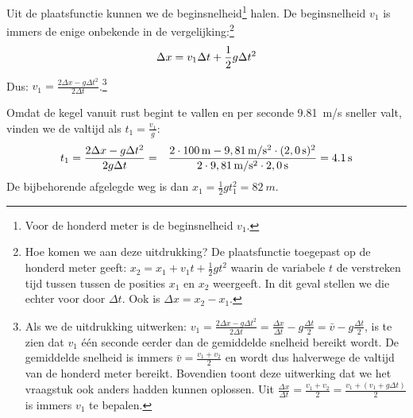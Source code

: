 \documentclass{ximera}
\begin{document}
\begin{exercise}
\begin{oplossing}
        Uit de plaatsfunctie kunnen we de beginsnelheid\footnote{Voor de honderd meter is de beginsnelheid $v_1$.} halen. De beginsnelheid $v_1$ is immers de enige onbekende in de vergelijking:\footnote{Hoe komen we aan deze uitdrukking? De plaatsfunctie toegepast op de honderd meter geeft: $x_2=x_1+v_1t+\frac{1}{2}gt^2$ waarin de variabele $t$ de verstreken tijd tussen tussen de posities $x_1$ en $x_2$ weergeeft. In dit geval stellen we die echter voor door $\Delta t$. Ook is $\Delta x=x_2-x_1$.}
        \begin{equation*}
            \Delta x=v_1\Delta t+\frac{1}{2}g\Delta t^2\\
        \end{equation*}
        Dus: $v_1=\frac{2\Delta x-g\Delta t^2}{2\Delta t}$.\footnote{Als we de uitdrukking uitwerken: $v_1=\frac{2\Delta x-g\Delta t^2}{2\Delta t}=\frac{\Delta x}{\Delta t}-g\frac{\Delta t}{2}=\bar{v}-g\frac{\Delta t}{2}$, is te zien dat $v_1$ \'e\'en seconde eerder dan de gemiddelde snelheid bereikt wordt. De gemiddelde snelheid is immers $\bar{v}=\frac{v_1+v_2}{2}$ en wordt dus halverwege de valtijd van de honderd meter bereikt. Bovendien toont deze uitwerking dat we het vraagstuk ook anders hadden kunnen oplossen. Uit $\frac{\Delta x}{\Delta t}=\frac{v_1+v_2}{2}=\frac{v_1+(v_1+g\Delta t)}{2}$ is immers $v_1$ te bepalen.}
        
        Omdat de kegel vanuit rust begint te vallen en per seconde \SI{9,81}{m/s} sneller valt, vinden we de valtijd als $t_1=\frac{v_1}{g}$:
        \begin{eqnarray*}
            t_1=\frac{2\Delta x-g\Delta t^2}{2g\Delta t}&=&\frac{2\cdot100\rm\,m-9,81\rm\,m/s^2\cdot(2,0\rm\,s)^2}{2\cdot9,81\rm\,m/s^2\cdot2,0\rm\,s}=\SI{4,1}{s}
        \end{eqnarray*}
        De bijbehorende afgelegde weg is dan $x_1=\frac{1}{2}gt_1^2=\SI{82}{m}$.
    \end{oplossing}
\end{exercise}
\end{document}
